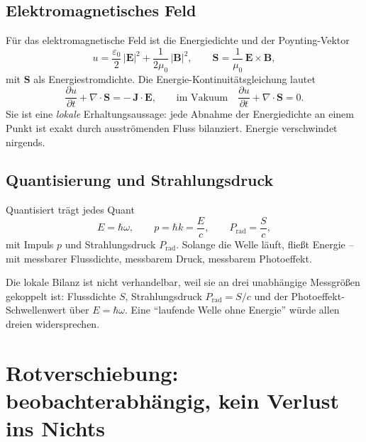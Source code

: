 \subsection{Elektromagnetisches Feld}

Für das elektromagnetische Feld ist die Energiedichte und der
Poynting-Vektor~\cite{poynting1884,jackson}
\begin{equation}
  u = \frac{\varepsilon_0}{2}\,|\mathbf E|^2
      + \frac{1}{2\mu_0}\,|\mathbf B|^2,
  \qquad
  \mathbf S = \frac{1}{\mu_0}\,\mathbf E\times\mathbf B,
  \label{eq:poynting277}
\end{equation}
mit $\mathbf S$ als Energiestromdichte. Die Energie-Kontinuitätsgleichung
lautet
\begin{equation}
  \frac{\partial u}{\partial t} + \nabla\!\cdot\mathbf S = -\,\mathbf J\!\cdot\mathbf E,
  \qquad\text{im Vakuum}\quad
  \frac{\partial u}{\partial t} + \nabla\!\cdot\mathbf S = 0.
  \label{eq:cont277}
\end{equation}
Sie ist eine \emph{lokale} Erhaltungsaussage: jede Abnahme der Energiedichte
an einem Punkt ist exakt durch ausströmenden Fluss bilanziert. Energie
verschwindet nirgends.

\subsection{Quantisierung und Strahlungsdruck}

Quantisiert trägt jedes Quant
\begin{equation}
  E = \hbar\omega, \qquad
  p = \hbar k = \frac{E}{c}, \qquad
  P_\text{rad} = \frac{S}{c},
  \label{eq:quant277}
\end{equation}
mit Impuls $p$ und Strahlungsdruck $P_\text{rad}$. Solange die Welle läuft,
fließt Energie -- mit messbarer Flussdichte, messbarem Druck, messbarem
Photoeffekt.

\begin{insight}
Die lokale Bilanz ist nicht verhandelbar, weil sie an drei unabhängige
Messgrößen gekoppelt ist: Flussdichte $S$, Strahlungsdruck $P_\text{rad}=S/c$
und der Photoeffekt-Schwellenwert über $E=\hbar\omega$. Eine \enquote{laufende
Welle ohne Energie} würde allen dreien widersprechen.
\end{insight}

\section{Rotverschiebung: beobachterabhängig, kein Verlust ins Nichts}

